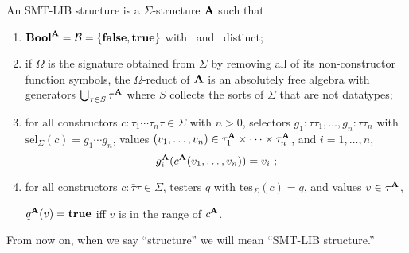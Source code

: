 \begin{definition}
\label{def:structure}
An SMT-LIB structure is a $\Sigma$-structure $\mathbf{A}$ such that

\begin{enumerate}
\item $\textbf{Bool}^{\mathbf{A}} = \mathcal{B} = \{ \textbf{false}, \textbf{true} \}$ with \false\ and \true\ distinct;


%

\item
if $\Omega$ is the signature obtained from $\Sigma$ by removing 
all of its non-constructor function symbols,
the $\Omega$-reduct of $\mathbf{A}$ is an absolutely free algebra with 
generators $\bigcup_{ \tau \in S} \tau^{\mathbf{A}}$
where $S$ collects the sorts of $\Sigma$ that are not datatypes;

\item
for all constructors $c{:}\tau_1\cdots\tau_n\tau \in \Sigma$ with $n>0$,
selectors $g_1{:}\tau\tau_1, \ldots, g_n{:}\tau\tau_n$ 
with $\mathrm{sel}_\Sigma(c) = g_1\cdots g_n$, 
values $(v_1, \ldots, v_n) \in \tau_1^{\mathbf{A}} \times \cdots \times \tau_n^{\mathbf{A}}$,
and
$i=1,\ldots,n$,
\[
 g_i^{\mathbf{A}}(c^{\mathbf{A}}(v_1, \ldots, v_n)) = v_i\ ;
\]

\item
for all constructors $c{:}\bar{\tau}\tau \in \Sigma$,
testers $q$ with $\mathrm{tes}_\Sigma(c) = q$, and 
values $v \in \tau^{\mathbf{A}}$,
\begin{center}
 $q^{\mathbf{A}}(v) = \textbf{true}$ iff $v$ is in the range of $c^{\mathbf{A}}$.
\end{center}
\end{enumerate}
\end{definition}


From now on, when we say ``structure'' we will mean ``SMT-LIB structure.''

